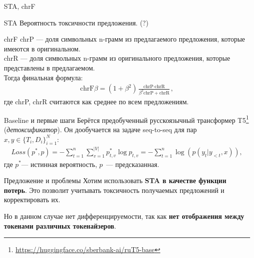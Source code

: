 \documentclass[12pt, fleqn, xcolor=x11names, xcolor=table, aspectratio=169]{beamer}
\begin{document}
\begin{frame}{STA, chrF}

\begin{alertblock}{STA}
Вероятность токсичности предложения. (?)
\end{alertblock}

\begin{alertblock}{chrF}
chrP --- доля символьных n-грамм из предлагаемого предложения, которые имеются в оригинальном. \\
chrR --- доля символьных n-грамм из оригинального предложения, которые представлены в предлагаемом.  \\ 
Тогда финальная формула:
\begin{gather*}
    \text{chrF}\beta = (1 + \beta^2) \frac{\text{chrP} \cdot \text{chrR}}{\beta^2 \text{chrP} + \text{chrR}},
\end{gather*}
где chrP, chrR считаются как среднее по всем предложениям. 
\end{alertblock}

\end{frame}


\begin{frame}{Baseline и первые шаги}
Берётся предобученный русскоязычный трансформер T5\footnote{\url{https://huggingface.co/sberbank-ai/ruT5-base}} (\textit{детоксификатор}).
Он дообучается на задаче seq-to-seq для пар $x, y \in \{T_i, D_{i}\}_{i=1}^{N}$:
\begin{gather*}
    Loss(p^*, p) = -\sum_{t=1}^{n} \sum_{v=1}^{|V|} p^{*}_{t, v} \log p_{t, v} = -\sum_{t=1}^{n} \log \left(p(y_{t} | y_{<t}, x) \right),
\end{gather*}
где $p^{*}$--- истинная вероятность, $p$~--- предсказанная.

\begin{alertblock}{Предложение и проблемы}
Хотим использовать \textbf{STA в качестве функции потерь}. 
Это позволит учитывать токсичность получаемых предложений и корректировать их.

Но в данном случае нет дифференцируемости, так как \textbf{нет отображения между токенами различных токенайзеров}. 
\end{alertblock}

\end{frame}
\end{document}
